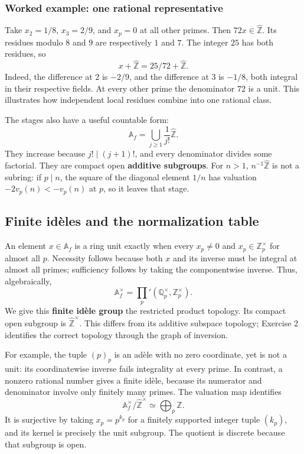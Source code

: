 \documentclass[
  english,
  11pt,
  a4paper,
]{article}
\begin{document}
\subsubsection{Worked example: one rational
representative}\label{NT-ADL-01--worked-example-one-rational-representative}

Take \(x_2=1/8\), \(x_3=2/9\), and \(x_p=0\) at all other primes. Then
\(72x\in\widehat{\mathbb Z}\). Its residues modulo \(8\) and \(9\) are
respectively \(1\) and \(7\). The integer \(25\) has both residues, so
\[x+\widehat{\mathbb Z}=25/72+\widehat{\mathbb Z}.\] Indeed, the
difference at \(2\) is \(-2/9\), and the difference at \(3\) is
\(-1/8\), both integral in their respective fields. At every other prime
the denominator \(72\) is a unit. This illustrates how independent local
residues combine into one rational class.

The stages also have a useful countable form:
\[\mathbb A_f=\bigcup_{j\geq1}\frac1{j!}\widehat{\mathbb Z}.
\tag{11}\] They increase because \(j!\mid(j+1)!\), and every denominator
divides some factorial. They are compact open \textbf{additive
subgroups}. For \(n>1\), \(n^{-1}\widehat{\mathbb Z}\) is not a subring:
if \(p\mid n\), the square of the diagonal element \(1/n\) has valuation
\(-2v_p(n)<-v_p(n)\) at \(p\), so it leaves that stage.

\subsection{Finite idèles and the normalization
table}\label{NT-ADL-01--finite-iduxe8les-and-the-normalization-table}

An element \(x\in\mathbb A_f\) is a ring unit exactly when every
\(x_p\neq0\) and \(x_p\in\mathbb Z_p^\times\) for almost all \(p\).
Necessity follows because both \(x\) and its inverse must be integral at
almost all primes; sufficiency follows by taking the componentwise
inverse. Thus, algebraically,
\[\mathbb A_f^\times=\prod_p'(\mathbb Q_p^\times,\mathbb Z_p^\times).\]
We give this \textbf{finite idèle group} the restricted product
topology. Its compact open subgroup is \(\widehat{\mathbb Z}^\times\).
This differs from its additive subspace topology; Exercise 2 identifies
the correct topology through the graph of inversion.

For example, the tuple \((p)_p\) is an adèle with no zero coordinate,
yet is not a unit: its coordinatewise inverse fails integrality at every
prime. In contrast, a nonzero rational number gives a finite idèle,
because its numerator and denominator involve only finitely many primes.
The valuation map identifies
\[\mathbb A_f^\times/\widehat{\mathbb Z}^\times\simeq\bigoplus_p\mathbb Z.\]
It is surjective by taking \(x_p=p^{k_p}\) for a finitely supported
integer tuple \((k_p)\), and its kernel is precisely the unit subgroup.
The quotient is discrete because that subgroup is open.
\end{document}
